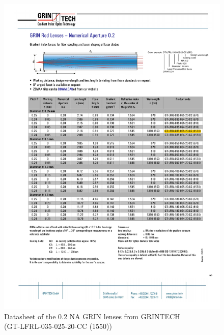 \begin{figure}[h!]\centering \includegraphics[width=16cm]{appendix/grin.pdf}
      \caption{Datasheet of the 0.2 NA GRIN lenses from GRINTECH \\(GT-LFRL-035-025-20-CC (1550))}
\end{figure}

